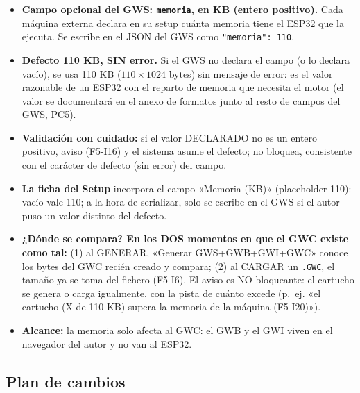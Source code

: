 \begin{itemize}
	\item \textbf{Campo opcional del GWS: \texttt{memoria}, en KB (entero
	positivo).} Cada máquina externa declara en su setup cuánta memoria
	tiene el ESP32 que la ejecuta. Se escribe en el JSON del GWS como
	\texttt{"memoria": 110}.
	\item \textbf{Defecto 110 KB, SIN error.} Si el GWS no declara el campo
	(o lo declara vacío), se usa 110 KB ($110 \times 1024$ bytes) sin
	mensaje de error: es el valor razonable de un ESP32 con el reparto de
	memoria que necesita el motor (el valor se documentará en el anexo de
	formatos junto al resto de campos del GWS, PC5).
	\item \textbf{Validación con cuidado:} si el valor DECLARADO no es un
	entero positivo, aviso (F5-I16) y el sistema asume el defecto; no
	bloquea, consistente con el carácter de defecto (sin error) del campo.
	\item \textbf{La ficha del Setup} incorpora el campo «Memoria (KB)»
	(placeholder 110): vacío vale 110; a la hora de serializar, solo se
	escribe en el GWS si el autor puso un valor distinto del defecto.
	\item \textbf{¿Dónde se compara? En los DOS momentos en que el GWC
	existe como tal:} (1) al GENERAR, «Generar GWS+GWB+GWI+GWC» conoce los
	bytes del GWC recién creado y compara; (2) al CARGAR un
	\texttt{.GWC}, el tamaño ya se toma del fichero (F5-I6). El aviso es
	NO bloqueante: el cartucho se genera o carga igualmente, con la pista
	de cuánto excede (p.~ej. «el cartucho (X de 110 KB) supera la memoria
	de la máquina (F5-I20)»).
	\item \textbf{Alcance:} la memoria solo afecta al GWC: el GWB y el GWI
	viven en el navegador del autor y no van al ESP32.
\end{itemize}

\subsection{Plan de cambios}
\label{sec:F5I20Plan}

